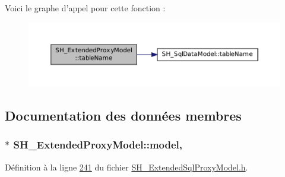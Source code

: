 Voici le graphe d'appel pour cette fonction \-:
\nopagebreak
\begin{figure}[H]
\begin{center}
\leavevmode
\includegraphics[width=350pt]{classSH__ExtendedProxyModel_aba6e6f8bbde17ea533de3e9a127c804a_cgraph}
\end{center}
\end{figure}




\subsection{Documentation des données membres}
\hypertarget{classSH__ExtendedProxyModel_a8c8b8930c6b1abd9bbb1dce1fdc9690b}{
\subsubsection[{model}]{$\ast$ S\-H\-\_\-\-Extended\-Proxy\-Model\-::model\hspace{0.3cm}{\ttfamily [protected]}, {\ttfamily [inherited]}}}\label{classSH__ExtendedProxyModel_a8c8b8930c6b1abd9bbb1dce1fdc9690b}


Définition à la ligne \hyperlink{SH__ExtendedSqlProxyModel_8h_source_l00241}{241} du fichier \hyperlink{SH__ExtendedSqlProxyModel_8h_source}{S\-H\-\_\-\-Extended\-Sql\-Proxy\-Model.\-h}.



